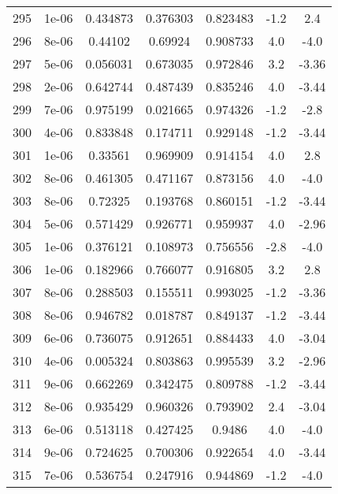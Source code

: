 \begin{table}
\begin{tabular}{c|c|c|c|c|c|c}
295 & 1e-06 & 0.434873 & 0.376303 & 0.823483 & -1.2 & 2.4\\
296 & 8e-06 & 0.44102 & 0.69924 & 0.908733 & 4.0 & -4.0\\
297 & 5e-06 & 0.056031 & 0.673035 & 0.972846 & 3.2 & -3.36\\
298 & 2e-06 & 0.642744 & 0.487439 & 0.835246 & 4.0 & -3.44\\
299 & 7e-06 & 0.975199 & 0.021665 & 0.974326 & -1.2 & -2.8\\
300 & 4e-06 & 0.833848 & 0.174711 & 0.929148 & -1.2 & -3.44\\
301 & 1e-06 & 0.33561 & 0.969909 & 0.914154 & 4.0 & 2.8\\
302 & 8e-06 & 0.461305 & 0.471167 & 0.873156 & 4.0 & -4.0\\
303 & 8e-06 & 0.72325 & 0.193768 & 0.860151 & -1.2 & -3.44\\
304 & 5e-06 & 0.571429 & 0.926771 & 0.959937 & 4.0 & -2.96\\
305 & 1e-06 & 0.376121 & 0.108973 & 0.756556 & -2.8 & -4.0\\
306 & 1e-06 & 0.182966 & 0.766077 & 0.916805 & 3.2 & 2.8\\
307 & 8e-06 & 0.288503 & 0.155511 & 0.993025 & -1.2 & -3.36\\
308 & 8e-06 & 0.946782 & 0.018787 & 0.849137 & -1.2 & -3.44\\
309 & 6e-06 & 0.736075 & 0.912651 & 0.884433 & 4.0 & -3.04\\
310 & 4e-06 & 0.005324 & 0.803863 & 0.995539 & 3.2 & -2.96\\
311 & 9e-06 & 0.662269 & 0.342475 & 0.809788 & -1.2 & -3.44\\
312 & 8e-06 & 0.935429 & 0.960326 & 0.793902 & 2.4 & -3.04\\
313 & 6e-06 & 0.513118 & 0.427425 & 0.9486 & 4.0 & -4.0\\
314 & 9e-06 & 0.724625 & 0.700306 & 0.922654 & 4.0 & -3.44\\
315 & 7e-06 & 0.536754 & 0.247916 & 0.944869 & -1.2 & -4.0\\
\end{tabular}
\end{table}
\newpage
